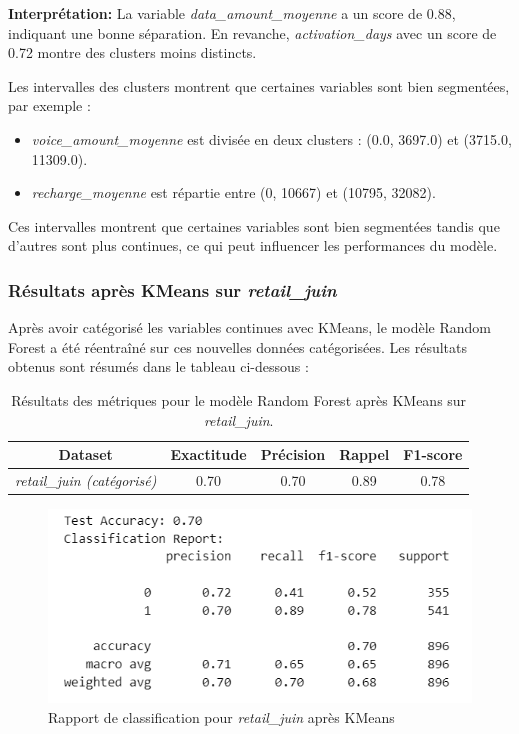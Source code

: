 \textbf{Interprétation:} La variable \textit{data\_amount\_moyenne} a un score de 0.88, indiquant une bonne séparation. En revanche, \textit{activation\_days} avec un score de 0.72 montre des clusters moins distincts.

Les intervalles des clusters montrent que certaines variables sont bien segmentées, par exemple :
\begin{itemize}
    \item \textit{voice\_amount\_moyenne} est divisée en deux clusters : (0.0, 3697.0) et (3715.0, 11309.0).
    \item \textit{recharge\_moyenne} est répartie entre (0, 10667) et (10795, 32082).
\end{itemize}

Ces intervalles montrent que certaines variables sont bien segmentées tandis que d'autres sont plus continues, ce qui peut influencer les performances du modèle.

\subsubsection{Résultats après KMeans sur \textit{retail\_juin}}

Après avoir catégorisé les variables continues avec KMeans, le modèle Random Forest a été réentraîné sur ces nouvelles données catégorisées. Les résultats obtenus sont résumés dans le tableau ci-dessous :

\begin{table}[H]
    \centering
    \begin{tabular}{|c|c|c|c|c|}
        \hline
        \textbf{Dataset} & \textbf{Exactitude} & \textbf{Précision} & \textbf{Rappel} & \textbf{F1-score} \\
        \hline
        \textit{retail\_juin (catégorisé)} & 0.70 & 0.70 & 0.89 & 0.78 \\
        \hline
    \end{tabular}
    \caption{Résultats des métriques pour le modèle Random Forest après KMeans sur \textit{retail\_juin}.}
\end{table}

\begin{figure}[H]
    \centering
    \includegraphics[width=0.6\linewidth]{capture_modele_17.png}
    \caption{Rapport de classification pour \textit{retail\_juin} après KMeans}
    \label{fig:classification_kmeans}
\end{figure}

